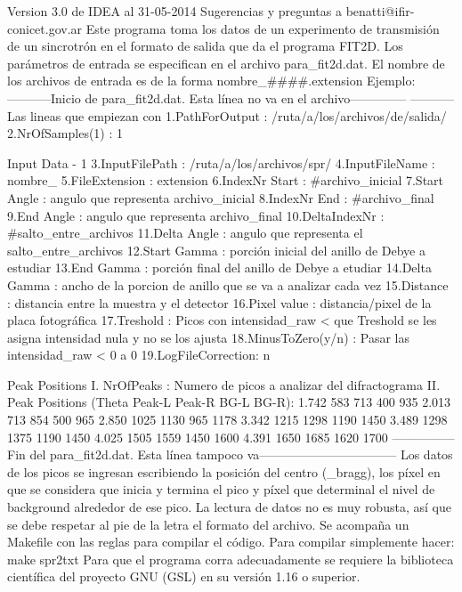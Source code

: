 Version 3.0 de IDEA al 31-05-2014
Sugerencias y preguntas a benatti@ifir-conicet.gov.ar
Este programa toma los datos de un experimento de transmisión de un sincrotrón en el formato de salida que da el programa FIT2D.
Los parámetros de entrada se especifican en el archivo para_fit2d.dat. El nombre de los archivos de entrada es de la forma nombre_####.extension
Ejemplo:
-----------Inicio de para_fit2d.dat. Esta línea no va en el archivo--------------
-----------Las lineas que empiezan con %
1.PathForOutput     : /ruta/a/los/archivos/de/salida/
2.NrOfSamples(1)    : 1

Input Data - 1
3.InputFilePath     : /ruta/a/los/archivos/spr/
4.InputFileName     : nombre_
5.FileExtension     : extension
6.IndexNr Start     : #archivo_inicial
7.Start Angle       : angulo que representa archivo_inicial
8.IndexNr End       : #archivo_final
9.End Angle         : angulo que representa archivo_final
10.DeltaIndexNr     : #salto_entre_archivos
11.Delta Angle      : angulo que representa el salto_entre_archivos
12.Start Gamma      : porción inicial del anillo de Debye a estudiar
13.End Gamma        : porción final del anillo de Debye a etudiar
14.Delta Gamma      : ancho de la porcion de anillo que se va a analizar cada vez
15.Distance         : distancia entre la muestra y el detector
16.Pixel value      : distancia/pixel de la placa fotográfica
17.Treshold         : Picos con intensidad_raw < que Treshold se les asigna intensidad nula y no se los ajusta
18.MinusToZero(y/n) : Pasar las intensidad_raw < 0 a 0 
19.LogFileCorrection: n

Peak Positions
I. NrOfPeaks        : Numero de picos a analizar del difractograma
II. Peak Positions
(Theta Peak-L Peak-R BG-L BG-R):
1.742 583 713 400 935
2.013 713 854 500 965
2.850 1025 1130 965 1178
3.342 1215 1298 1190 1450
3.489 1298 1375 1190 1450
4.025 1505 1559 1450 1600
4.391 1650 1685 1620 1700
---------------Fin del para_fit2d.dat. Esta línea tampoco va---------------------------------
Los datos de los picos se ingresan escribiendo la posición del centro (\theta_{bragg}), los píxel en que se considera que inicia y termina el pico y píxel que determinal el nivel de background alrededor de ese pico.
La lectura de datos no es muy robusta, así que se debe respetar al pie de la letra el formato del archivo.
Se acompaña un Makefile con las reglas para compilar el código. Para compilar simplemente hacer:
make spr2txt
Para que el programa corra adecuadamente se requiere la biblioteca científica del proyecto GNU (GSL) en su versión 1.16 o superior.

